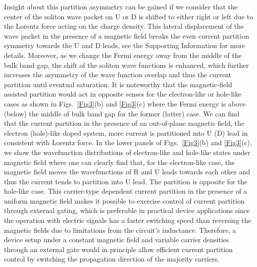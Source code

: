\documentclass[journal=nalefd,manuscript=communication]{achemso}
\begin{document}
Insight about this partition asymmetry can be gained if we consider that the center of the soliton wave packet on U or D is shifted to either right or left due to the Lorentz force acting on the charge density. This lateral displacement of the wave packet in the presence of a magnetic field breaks the even current partition symmetry towards the U and D leads, see the Supporting Information for more details. Moreover, as we change the Fermi energy away from the middle of the bulk band gap, the shift of the soliton wave functions is enhanced, which further increases the asymmetry of the wave function overlap and thus the current partition until eventual saturation. It is noteworthy that the magnetic-field assisted partition would act in opposite senses for the electron-like or hole-like cases as shown in Figs.~\ref{Fig3}(b) and \ref{Fig3}(c) where the Fermi energy is above (below) the middle of bulk band gap for the former (latter) case. We can find that the current partition
in the presence of an out-of-plane magnetic field, the electron (hole)-like doped system, more current is partitioned into U (D) lead in consistent with Lorentz force. In the lower panels of Figs.~\ref{Fig3}(b) and \ref{Fig3}(c), we show the wavefunction distributions of electron-like and hole-like states under magnetic field where one can clearly find that, for the electron-like case, the magnetic field moves the wavefunctions of R and U leads towards each other and thus the current tends to partition into U lead. The partition is opposite for the hole-like case. This carrier-type dependent current partition in the presence of a uniform magnetic field makes it possible to exercise control of current partition through external gating, which is preferable in practical device applications since the operation with electric signals has a faster switching speed than reversing the magnetic fields due to limitations from the circuit's inductance. Therefore, a device setup under a constant magnetic field and variable carrier densities through an external gate would in principle allow efficient current partition control by switching the propagation direction of the majority carriers.
\end{document}
